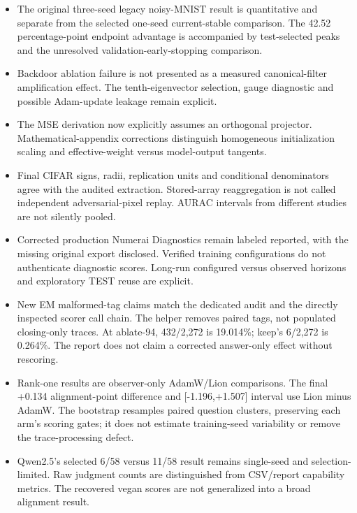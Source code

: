 \documentclass[
  british,
  10pt,
  a4paper,
]{article}
\providecommand{\tightlist}{%
  \setlength{\itemsep}{0pt}\setlength{\parskip}{0pt}}
\begin{document}
\begin{itemize}
\tightlist
\item[$\boxtimes$]
  The original three-seed legacy noisy-\allowbreak{}MNIST result is
  quantitative and separate from the selected one-seed
  current-\allowbreak{}stable comparison.\allowbreak{} The 42.52
  percentage-\allowbreak{}point endpoint advantage is accompanied by
  test-\allowbreak{}selected peaks and the unresolved
  validation-\allowbreak{}early-\allowbreak{}stopping
  comparison.\allowbreak{}
\item[$\boxtimes$]
  Backdoor ablation failure is not presented as a measured
  canonical-\allowbreak{}filter amplification effect. The
  tenth-\allowbreak{}eigenvector selection, gauge diagnostic and
  possible Adam-\allowbreak{}update leakage remain explicit.
\item[$\boxtimes$]
  The MSE derivation now explicitly assumes an orthogonal projector.
  Mathematical\allowbreak{}-\allowbreak{}appendix corrections
  distinguish homogeneous initialization scaling and
  effective-\allowbreak{}weight versus model-\allowbreak{}output
  tangents.
\item[$\boxtimes$]
  Final CIFAR signs, radii, replication units and conditional
  denominators agree with the audited extraction.\allowbreak{}
  Stored-\allowbreak{}array reaggregation is not called independent
  adversarial-\allowbreak{}pixel replay. AURAC intervals from different
  studies are not silently pooled.
\item[$\boxtimes$]
  Corrected production Numerai Diagnostics remain labeled reported, with
  the missing original export disclosed. Verified training
  configurations do not authenticate diagnostic scores. Long-run
  configured versus observed horizons and exploratory TEST reuse are
  explicit.
\item[$\boxtimes$]
  New EM malformed-\allowbreak{}tag claims match the dedicated audit and
  the directly inspected scorer call chain. The helper removes paired
  tags, not populated closing-\allowbreak{}only traces. At ablate-94,
  432/2,272 is 19.014\%; keep's 6/2,272 is 0.264\%. The report does not
  claim a corrected answer-\allowbreak{}only effect without rescoring.
\item[$\boxtimes$]
  Rank-one results are observer-\allowbreak{}only AdamW/Lion
  comparisons.\allowbreak{} The final +0.134
  alignment-\allowbreak{}point difference and
  [-\allowbreak{}1.\allowbreak{}196,\allowbreak{}+1.\allowbreak{}507]
  interval use Lion minus AdamW. The bootstrap resamples paired question
  clusters, preserving each arm's scoring gates; it does not estimate
  training-\allowbreak{}seed variability or remove the
  trace-\allowbreak{}processing defect.
\item[$\boxtimes$]
  Qwen2.5's selected 6/58 versus 11/58 result remains
  single-\allowbreak{}seed and
  selection-\allowbreak{}limited.\allowbreak{} Raw judgment counts are
  distinguished from CSV/report capability metrics. The recovered vegan
  scores are not generalized into a broad alignment result.
\end{itemize}
\end{document}
